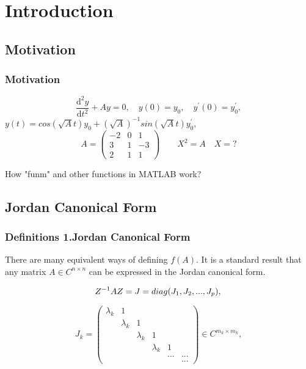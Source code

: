 

\section{Introduction}


\subsection{Motivation}

\begin{frame}

\frametitle{Motivation}
\[
\frac{\mathrm{d^2} y}{\mathrm{d} t^2}+Ay= 0 ,\quad y(0) = y_0, \quad y^{'}(0) = y^{'}_0,
\]
$y(t) = cos(\sqrt{A}t)y_0 + (\sqrt{A})^{-1}sin(\sqrt{A}t)y^{'}_0 ,$
\newline
\newline
\[
A = \begin{pmatrix}
    -2 & 0 & 1 \\
     3 & 1 & -3 \\
     2 & 1 & 1
\end{pmatrix}
\quad \quad 
X^2 = A \quad X = ?
\]  
\newline
\newline

How "funm" and other functions in MATLAB work?
\end{frame}


\subsection{Jordan Canonical Form}


\begin{frame}

\frametitle{Definitions \newline 1.Jordan Canonical Form}
There are many equivalent ways of defining $f(A)$.\newline
It is a standard result that any matrix $A \in C^{n \times n}$ can be expressed in the Jordan
canonical form. \newline

\[
Z^{-1}AZ = J = diag(J_{1},J_{2},...,J_{p}),\newline
\]

\[
J_{k}= \begin{pmatrix}
    \lambda_{k} & 1 & \\
      & \lambda_{k} &1& \\
     &  & \lambda_{k} &1 & \\
     & & & \lambda_{k} &1 & \\
     &&&&...&... \\
     &&&&&...
\end{pmatrix} \in C^{m_{k} \times m_{k} } ,
\]

\end{frame}

